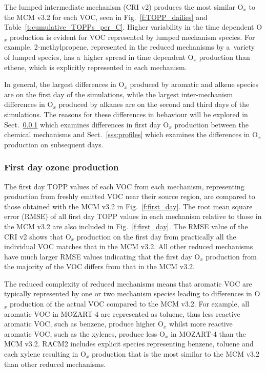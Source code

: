 \documentclass[acpd, online, hvmath]{copernicus}
\begin{document}
The lumped intermediate mechanism (CRI v2) produces the most similar
O$_{x}$ to the MCM v3.2 for each VOC, seen in
Fig.~\ref{f:TOPP_dailies} and Table~\ref{t:cumulative_TOPPs_per_C}.
Higher variability in the time dependent O$_{x}$ production is
evident for VOC represented by lumped mechanism species.  For example,
2-methylpropene, represented in the reduced mechanisms by a~variety of
lumped species, has a~higher spread in time dependent O$_{x}$
production than ethene, which is explicitly represented in each
mechanism.

In general, the largest differences in O$_{x}$ produced by aromatic
and alkene species are on the first day of the simulations, while the
largest inter-mechanism differences in O$_{x}$ produced by alkanes
are on the second and third days of the simulations.  The reasons for
these differences in behaviour will be explored in
Sect.~\ref{sss:day1} which examines differences in first day
O$_{x}$ production between the chemical mechanisms and
Sect.~\ref{sss:profiles} which examines the differences in O$_{x}$
production on subsequent days.

\subsubsection{First day ozone production}
\label{sss:day1}

The first day TOPP values of each VOC from each mechanism,
representing  production from freshly emitted VOC near their
source region, are compared to those obtained with the MCM v3.{2} in
Fig.~\ref{f:first_day}.  The root mean square error (RMSE) of all
first day TOPP values in each mechanism relative to those in the MCM
v3.2 are also included in Fig.~\ref{f:first_day}.  The RMSE value of
the CRI v2 shows that O$_{x}$ production on the first day from
practically all the individual VOC matches that in the MCM v3.2.  All
other reduced mechanisms have much larger RMSE values indicating that
the first day O$_{x}$ production from the majority of the VOC
differs from that in the MCM v3.2.

The reduced complexity of reduced mechanisms means that aromatic VOC
are typically represented by one or two mechanism species leading to
differences in O$_{x}$ production of the actual VOC compared to the
MCM v3.2.  For example, all aromatic VOC in MOZART-4 are represented
as toluene, thus less reactive aromatic VOC, such as benzene, produce
higher O$_{x}$ whilst more reactive aromatic VOC, such as the
xylenes, produce less O$_{x}$ in MOZART-4 than the MCM v3.2.  RACM2
includes explicit species representing benzene, toluene and each
xylene resulting in O$_{x}$ production that is the most similar to
the MCM v3.2 than other reduced mechanisms.
\end{document}
